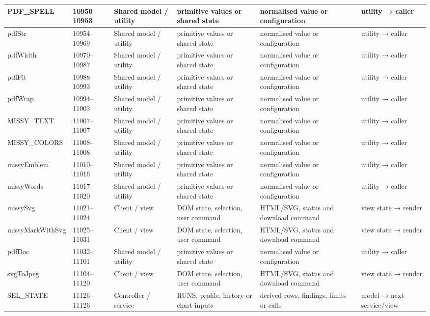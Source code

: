 \begin{landscape}
\begin{longtable}{@{}p{3.2cm}p{1.45cm}p{2.7cm}p{4.0cm}p{4.0cm}p{3.0cm}@{}}
PDF\_SPELL & 10950--10953 & Shared model / utility & primitive values or shared state & normalised value or configuration & utility → caller \\\hline
pdfStr & 10954--10969 & Shared model / utility & primitive values or shared state & normalised value or configuration & utility → caller \\\hline
pdfWidth & 10970--10987 & Shared model / utility & primitive values or shared state & normalised value or configuration & utility → caller \\\hline
pdfFit & 10988--10993 & Shared model / utility & primitive values or shared state & normalised value or configuration & utility → caller \\\hline
pdfWrap & 10994--11003 & Shared model / utility & primitive values or shared state & normalised value or configuration & utility → caller \\\hline
MISSY\_TEXT & 11007--11007 & Shared model / utility & primitive values or shared state & normalised value or configuration & utility → caller \\\hline
MISSY\_COLORS & 11008--11008 & Shared model / utility & primitive values or shared state & normalised value or configuration & utility → caller \\\hline
missyEmblem & 11010--11016 & Shared model / utility & primitive values or shared state & normalised value or configuration & utility → caller \\\hline
missyWords & 11017--11020 & Shared model / utility & primitive values or shared state & normalised value or configuration & utility → caller \\\hline
missySvg & 11021--11024 & Client / view & DOM state, selection, user command & HTML/SVG, status and download command & view state → render \\\hline
missyMarkWithSvg & 11025--11031 & Client / view & DOM state, selection, user command & HTML/SVG, status and download command & view state → render \\\hline
pdfDoc & 11032--11101 & Shared model / utility & primitive values or shared state & normalised value or configuration & utility → caller \\\hline
svgToJpeg & 11104--11120 & Client / view & DOM state, selection, user command & HTML/SVG, status and download command & view state → render \\\hline
SEL\_STATE & 11126--11126 & Controller / service & RUNS, profile, history or chart inputs & derived rows, findings, limits or calls & model → next service/view \\\hline

\end{longtable}
\end{landscape}
